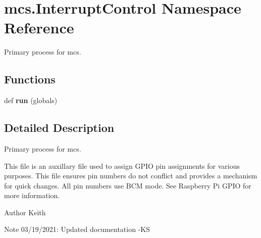 \hypertarget{namespacemcs_1_1InterruptControl}{}\section{mcs.\+Interrupt\+Control Namespace Reference}
\label{namespacemcs_1_1InterruptControl}


Primary process for mcs.  


\subsection*{Functions}
\begin{DoxyCompactItemize}
\item 
\mbox{\label{namespacemcs_1_1InterruptControl_a7ad985090141e28285532eac24c8cfa7}} 
def {\bfseries run} (globals)
\end{DoxyCompactItemize}


\subsection{Detailed Description}
Primary process for mcs. 

This file is an auxillary file used to assign G\+P\+IO pin assignments for various purposes. This file ensures pin numbers do not conflict and provides a mechanism for quick changes. All pin numbers use B\+CM mode. See Raspberry Pi G\+P\+IO for more information. \begin{DoxyAuthor}{Author}
Keith 
\end{DoxyAuthor}
\begin{DoxyNote}{Note}
03/19/2021\+: Updated documentation -\/\+KS 
\end{DoxyNote}
